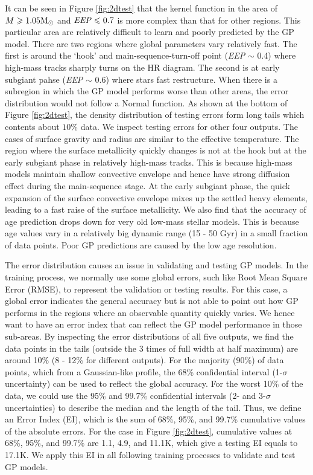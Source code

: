 It can be seen in Figure \ref{fig:2dtest} that the kernel function in the area of $M \geq 1.05 {\rm M_{\odot}}$ and ${\it EEP} \leq 0.7$ is more complex than that for other regions. This particular area are relatively difficult to learn and poorly predicted by the GP model. 
%
There are two regions where global parameters vary relatively fast. The first is around the `hook' and main-sequence-turn-off point ({\it EEP} $\sim$ 0.4) where high-mass tracks sharply turns on the HR diagram. The second is at early subgiant pahse ({\it EEP} $\sim$ 0.6) where stars fast restructure. 
%
When there is a subregion in which the GP model performs worse than other areas, the error distribution would not follow a Normal function. As shown at the bottom of Figure \ref{fig:2dtest}, the density distribution of testing errors form long tails which contents about $10\%$ data. 
%
We inspect testing errors for other four outputs. The cases of surface gravity and radius are similar to the effective temperature. The region where the surface metallicity quickly changes is not at the hook but at the early subgiant phase in relatively high-mass tracks. This is because high-mass models maintain shallow convective envelope and hence have strong diffusion effect during the main-sequence stage. At the early subgiant phase, the quick expansion of the surface convective envelope mixes up the settled heavy elements, leading to a fast raise of the surface metallicity. 
%
We also find that the accuracy of age prediction drops down for very old low-mass stellar models. This is because age values vary in a relatively big dynamic range (15 - 50 Gyr) in a small fraction of data points. Poor GP predictions are caused by the low age resolution.         
 

The error distribution causes an issue in validating and testing GP models. In the training process, we normally use some global errors, such like Root Mean Square Error (RMSE), to represent the validation or testing results. For this case, a global error indicates the general accuracy but is not able to point out how GP performs in the regions where an observable quantity quickly varies. 
%
We hence want to have an error index that can reflect the GP model performance in those sub-areas. By inspecting the error distributions of all five outputs, we find the data points in the tails (outside the 3 times of full width at half maximum) are around 10\% (8 - 12\% for different outputs).  For the majority (90\%) of data points, which from a Gaussian-like profile, the 68\% confidential interval (1-$\sigma$ uncertainty) can be used to reflect the global accuracy. For the worst 10\% of the data, we could use the 95\% and 99.7\% confidential intervals (2- and 3-$\sigma$ uncertainties) to describe the median and the length of the tail. Thus, we define an Error Index (EI), which is the sum of 68\%, 95\%, and 99.7\% cumulative values of the absolute errors. For the case in Figure \ref{fig:2dtest}, cumulative values at 68\%, 95\%, and 99.7\% are 1.1, 4.9, and 11.1K, which give a testing EI equals to 17.1K. We apply this EI in all following training processes to validate and test GP models. 

